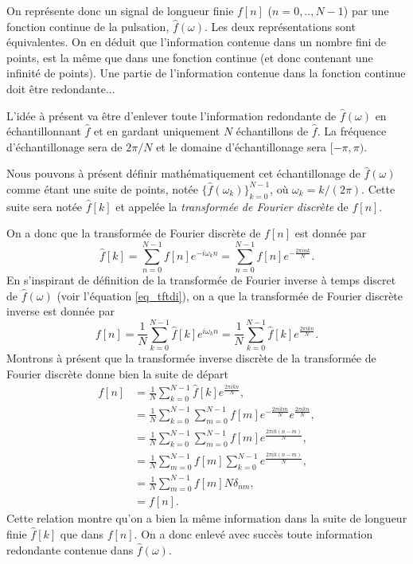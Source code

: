 \documentclass[a4paper,12pt]{book}
\newcommand{\fh}{\hat{f}}
\begin{document}
On représente donc un signal de longueur finie $f[n]$ ($n=0,..,N-1$) par une fonction
continue de la pulsation, $\fh(\omega)$. Les deux représentations sont équivalentes. On en
déduit que l'information contenue dans un nombre fini de points, est la même que dans une
fonction continue (et donc contenant une infinité de points). 
Une partie de l'information contenue dans la fonction continue doit être redondante...

L'idée à présent va être d'enlever toute l'information redondante de $\fh(\omega)$ en
échantillonnant $\fh$ et en gardant uniquement $N$ échantillons de $\fh$. La fréquence 
d'échantillonage sera de $2\pi/N$ et le domaine d'échantillonage sera $[-\pi,\pi)$.

Nous pouvons à présent définir mathématiquement cet échantillonage de $\fh(\omega)$ comme
étant une suite de points, notée $\{\fh(\omega_k)\}_{k=0}^{N-1}$, où $\omega_k=k/(2\pi)$.
Cette suite sera notée $\fh[k]$ et appelée la \textit{transformée de Fourier discrète} de
$f[n]$.

On a donc que la transformée de Fourier discrète de $f[n]$ est donnée par
\begin{equation}
 \fh[k]=\sum_{n=0}^{N-1} f[n] e^{-i\omega_k n}
       =\sum_{n=0}^{N-1} f[n] e^{-\frac{2\pi i n k}{N}}.\label{eq_tfd}
\end{equation}
En s'inspirant de définition de la transformée de Fourier inverse à temps discret de
$\fh(\omega)$ (voir l'équation \eqref{eq_tftdi}), on a que la transformée de Fourier
discrète inverse est donnée par
\begin{equation}
 f[n]=\frac{1}{N}\sum_{k=0}^{N-1} \fh[k] e^{i\omega_k n}
 =\frac{1}{N}\sum_{k=0}^{N-1} \fh[k] e^{\frac{2\pi i k n}{N}}.
\end{equation}
Montrons à présent que la transformée inverse discrète de la transformée de Fourier 
discrète donne bien la suite de départ
\begin{align}
 f[n]&=\frac{1}{N}\sum_{k=0}^{N-1} \fh[k] e^{\frac{2\pi i k n}{N}},\nonumber\\
 &=\frac{1}{N}\sum_{k=0}^{N-1} \sum_{m=0}^{N-1} f[m] e^{-\frac{2\pi i k m}{N}} e^{\frac{2\pi i k n}{N}},\nonumber\\
 &=\frac{1}{N}\sum_{k=0}^{N-1} \sum_{m=0}^{N-1} f[m] e^{\frac{2\pi i k (n-m)}{N}},\nonumber\\
 &=\frac{1}{N}\sum_{m=0}^{N-1} f[m] \sum_{k=0}^{N-1} e^{\frac{2\pi i k (n-m)}{N}},\nonumber\\
 &=\frac{1}{N}\sum_{m=0}^{N-1} f[m] N \delta_{nm},\nonumber\\
 &=f[n].
\end{align}
Cette relation montre qu'on a bien la même information dans la suite de longueur finie 
$\fh[k]$ que dans $f[n]$. On a donc enlevé avec succès toute information redondante contenue
dans $\fh(\omega)$. 
\end{document}
